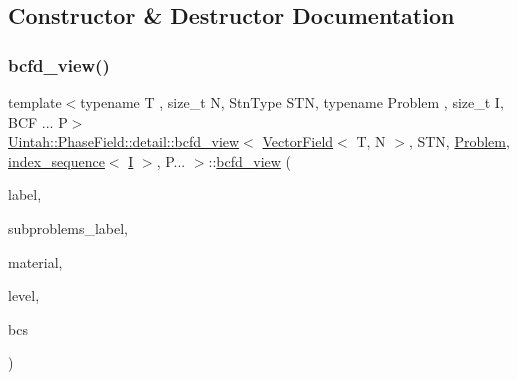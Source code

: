 \subsection{Constructor \& Destructor Documentation}
\mbox{\label{classUintah_1_1PhaseField_1_1detail_1_1bcfd__view_3_01VectorField_3_01T_00_01N_01_4_00_01STN_00_1a8b5a6da126f9f6f13d940aa745f239_a31c9bb4fc69202ba43f6914a2f2d8a82}} 
\subsubsection{\texorpdfstring{bcfd\+\_\+view()}{bcfd\_view()}\hspace{0.1cm}{\footnotesize\ttfamily [1/3]}}
{\footnotesize\ttfamily template$<$typename T , size\+\_\+t N, Stn\+Type S\+TN, typename Problem , size\+\_\+t I, B\+C\+F ... P$>$ \\
\hyperlink{classUintah_1_1PhaseField_1_1detail_1_1bcfd__view}{Uintah\+::\+Phase\+Field\+::detail\+::bcfd\+\_\+view}$<$ \hyperlink{structUintah_1_1PhaseField_1_1VectorField}{Vector\+Field}$<$ T, N $>$, S\+TN, \hyperlink{classUintah_1_1PhaseField_1_1Problem}{Problem}, \hyperlink{namespaceUintah_1_1PhaseField_a237de804d99512e50613aff7c94a9461}{index\+\_\+sequence}$<$ \hyperlink{structUintah_1_1PhaseField_1_1I}{I} $>$, P... $>$\+::\hyperlink{classUintah_1_1PhaseField_1_1detail_1_1bcfd__view}{bcfd\+\_\+view} (\begin{DoxyParamCaption}\item[{const typename \hyperlink{structUintah_1_1PhaseField_1_1VectorField_a59698346336d8cdfdf767367839f2be9}{Field\+::label\+\_\+type} \&}]{label,  }\item[{const Var\+Label $\ast$}]{subproblems\+\_\+label,  }\item[{int}]{material,  }\item[{const Level $\ast$}]{level,  }\item[{const std\+::vector$<$ \hyperlink{structUintah_1_1PhaseField_1_1BCInfo}{B\+C\+Info}$<$ \hyperlink{structUintah_1_1PhaseField_1_1VectorField}{Field} $>$ $>$ \&}]{bcs }\end{DoxyParamCaption})\hspace{0.3cm}{\ttfamily [inline]}}



